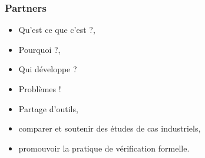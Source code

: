 \documentclass[t, english]{beamer}
\begin{document}
\begin{frame}[c]
  \frametitle{Partners}
  
  \begin{minipage}{.7\textwidth}
     \begin{itemize}
     \item <1->Qu'est ce que c'est ?,
     \item <2->Pourquoi ?,
     \item <3->Qui développe ?
     \item <4->Problèmes !
     \end{itemize}
  \end{minipage}
  
  \begin{minipage}{.25\textwidth}
  \centering
  \end{minipage}
  
  \begin{minipage}{.7\textwidth}
     \begin{itemize}
     \item Partage d'outils,
     \item comparer et soutenir des études de cas industriels,
     \item promouvoir la pratique de vérification formelle.
     \end{itemize}
  \end{minipage}
 \end{frame}
\end{document}
